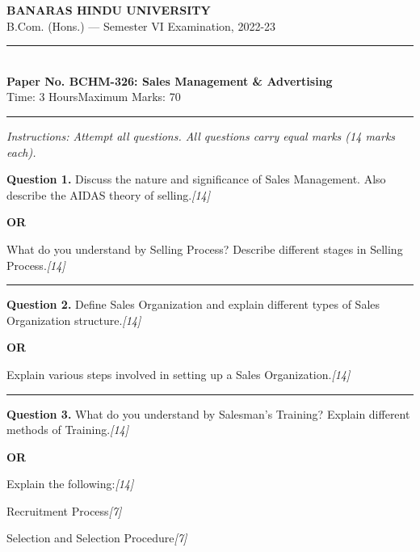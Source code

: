 \documentclass[11pt,a4paper]{article}
\newcommand{\pts}[1]{\hfill   \textit{[#1]}}
\begin{document}
\begin{center}
  {\large\bfseries BANARAS HINDU UNIVERSITY}\\[2pt]
  {\normalsize B.Com. (Hons.) --- Semester VI Examination, 2022-23}\\[6pt]
  \rule{0.8\linewidth}{0.5pt}\\[6pt]
  {\large\bfseries Paper No. BCHM-326: Sales Management \& Advertising}\\[4pt]
  {\normalsize Time: 3 Hours\hfill Maximum Marks: 70}
\end{center}

\rule{\linewidth}{0.4pt}

\smallskip



\noindent   \textit{Instructions: Attempt all questions. All questions carry equal marks (14 marks each).}

\bigskip




\noindent   \textbf{Question 1.}
Discuss the nature and significance of Sales Management. Also describe the AIDAS theory of selling.\pts{14}

\centerline{   \textbf{OR}}

What do you understand by Selling Process? Describe different stages in Selling Process.\pts{14}

\medskip\rule{\linewidth}{0.2pt}




\noindent   \textbf{Question 2.}
Define Sales Organization and explain different types of Sales Organization structure.\pts{14}

\centerline{   \textbf{OR}}

Explain various steps involved in setting up a Sales Organization.\pts{14}

\medskip\rule{\linewidth}{0.2pt}




\noindent   \textbf{Question 3.}
What do you understand by Salesman's Training? Explain different methods of Training.\pts{14}

\centerline{   \textbf{OR}}

Explain the following:\pts{14}

\begin{parts}
  \item Recruitment Process\pts{7}
  \item Selection and Selection Procedure\pts{7}
\end{parts}
\end{document}

